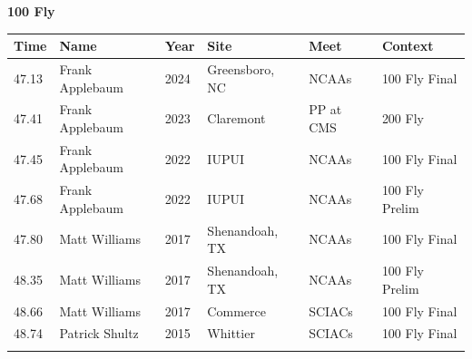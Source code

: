 \vspace{1.2em}
\noindent\begin{minipage}[t]{0.98\textwidth}
\centering
\textbf{\textcolor{teamprimary}{100 Fly}}\par
\vspace{0.5em}
\centering
\small
\renewcommand{\arraystretch}{1.0}
\setlength{\tabcolsep}{4pt}
\begin{tabular}{@{}p{2.0cm}p{3.2cm}p{1.2cm}p{2.0cm}p{2.0cm}p{2.5cm}@{}}
\toprule
\textbf{Time} & \textbf{Name} & \textbf{Year} & \textbf{Site} & \textbf{Meet} & \textbf{Context} \\
\midrule
47.13 & Frank Applebaum & 2024 & Greensboro, NC & NCAAs & 100 Fly Final \\
47.41 & Frank Applebaum & 2023 & Claremont & PP at CMS & 200 Fly \\
47.45 & Frank Applebaum & 2022 & IUPUI & NCAAs & 100 Fly Final \\
47.68 & Frank Applebaum & 2022 & IUPUI & NCAAs & 100 Fly Prelim \\
47.80 & Matt Williams & 2017 & Shenandoah, TX & NCAAs & 100 Fly Final \\
48.35 & Matt Williams & 2017 & Shenandoah, TX & NCAAs & 100 Fly Prelim \\
48.66 & Matt Williams & 2017 & Commerce & SCIACs & 100 Fly Final \\
48.74 & Patrick Shultz & 2015 & Whittier & SCIACs & 100 Fly Final \\
\bottomrule
\vspace{0.5em}
\end{tabular}
\end{minipage}
\vspace{1.2em}
